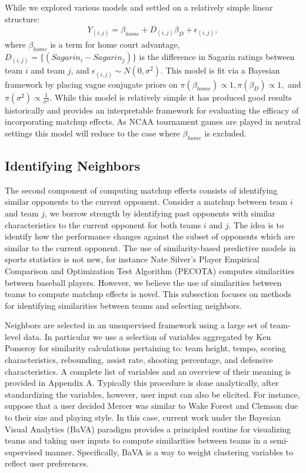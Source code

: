 \documentclass[letterpaper,12pt]{article}
\begin{document}
While we explored various models and settled on a relatively simple linear structure:
\begin{eqnarray}
Y_{(i,j)} =  \beta_{home} + D_{(i,j)}\beta_D +  \epsilon_{(i,j)},
\label{eq:RS2}
\end{eqnarray}
where $\beta_{home}$ is a term for home court advantage, $D_{(i,j)}=\{(Sagarin_{i} - Sagarin_{j})\}$ is the difference in Sagarin ratings between team $i$ and team $j$, and $\epsilon_{(i,j)} \sim N(0,\sigma^2).$ This model is fit via a Bayesian framework by placing vague conjugate priors on $\pi(\beta_{home})\propto 1, \pi(\beta_D) \propto 1,$ and $ \pi(\sigma^2) \propto \frac{1}{\sigma^2}$. While this model is relatively simple it has produced good results historically \citep{carlin1996} and provides an interpretable framework for evaluating the efficacy of incorporating matchup effects. As NCAA tournament games are played in neutral settings this model will reduce to the case where $\beta_{home}$ is excluded.

\subsection{Identifying Neighbors \label{sec:neighbors}}
The second component of computing matchup effects consists of identifying similar opponents to the current opponent. Consider a matchup between team $i$ and team $j$, we borrow strength by identifying past opponents with similar characteristics to the current opponent for both teams $i$ and $j$. The idea is to identify how the performance changes against the subset of opponents which are similar to the current opponent. The use of similarity-based predictive models in sports statistics is not new, for instance Nate Silver's Player Empirical Comparison and Optimization Test Algorithm (PECOTA) \citep{silver2003} computes similarities between baseball players. However, we believe the use of similarities between teams to compute matchup effects is novel. This subsection focuses on methods for identifying similarities between teams and selecting neighbors.

Neighbors are selected in an unsupervised framework using a large set of team-level data. In particular we use a selection of variables aggregated by Ken Pomeroy \citep{kenpom.com} for similarity calculations pertaining to: team height, tempo, scoring characteristics, rebounding,  assist rate, shooting percentage, and defensive characteristics. A complete list of variables and an overview of their meaning is provided in Appendix A. Typically this procedure is done analytically, after standardizing the variables, however, user input can also be elicited. For instance, suppose that a user decided Mercer was similar to Wake Forest and Clemson due to their size and playing style. In this case, current work under the Bayesian Visual Analytics (BaVA) paradigm \citep{house2010, hu2013} provides a principled routine for visualizing teams and taking user inputs to compute similarities between teams in a semi-supervised manner. Specifically, BaVA is a way to weight clustering variables to reflect user preferences.
\end{document}
